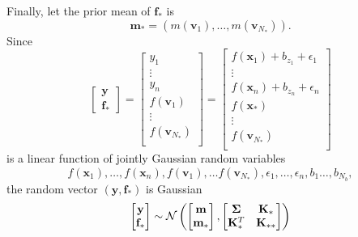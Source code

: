 Finally, let the prior mean of $\mathbf{f}_*$ is
\begin{equation*}
    \mathbf{m}_* = (m(\mathbf{v}_1), \dots, m(\mathbf{v}_{N_*})).
\end{equation*}
Since
\begin{equation*}
    \begin{bmatrix}
        \mathbf{y} \\
        \mathbf{f}_{*}
    \end{bmatrix}
    =
    \begin{bmatrix}
        y_1 \\
        \vdots \\
        y_n \\
        f(\mathbf{v}_1) \\
        \vdots \\
        f(\mathbf{v}_{N_{*}}) \\
    \end{bmatrix}
    =
    \begin{bmatrix}
        f(\mathbf{x}_1) + b_{z_1} + \epsilon_1 \\
        \vdots \\
        f(\mathbf{x}_n) + b_{z_n} + \epsilon_n \\
        f(\mathbf{x}_*) \\
        \vdots \\
        f(\mathbf{v}_{N_{*}}) \\
    \end{bmatrix}
\end{equation*}
is a linear function of jointly Gaussian random variables
\begin{equation*}
    f(\mathbf{x}_1), \dots, f(\mathbf{x}_n), f(\mathbf{v}_1), \dots f(\mathbf{v}_{N_*}), \epsilon_1, \dots, \epsilon_n, b_1 \dots, b_{N_b},
\end{equation*}
the random vector $(\mathbf{y}, \mathbf{f}_*)$ is Gaussian
\begin{equation*}
    \begin{bmatrix}
        \mathbf{y} \\
        \mathbf{f}_*
    \end{bmatrix}
    \sim
    \mathcal{N}\left(
    \begin{bmatrix}
            \mathbf{m} \\
            \mathbf{m}_*
        \end{bmatrix}
    ,
    \begin{bmatrix}
            \boldsymbol{\Sigma} & \mathbf{K}_* \\
            \mathbf{K}_*^T & \mathbf{K}_{* *}
        \end{bmatrix}
    \right)
\end{equation*}
